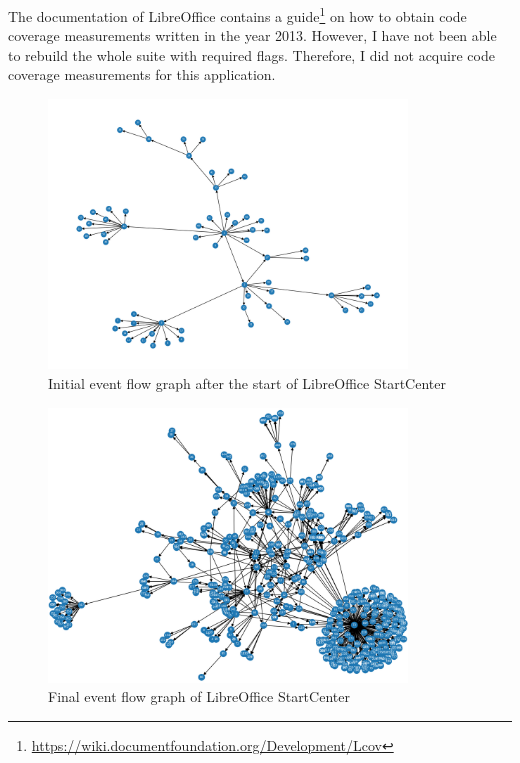 The documentation of LibreOffice contains a guide\footnote{\url{https://wiki.documentfoundation.org/Development/Lcov}} on how to obtain code coverage measurements written in the year 2013. However, I have not been able to rebuild the whole suite with required flags. Therefore, I did not acquire code coverage measurements for this application.   


\begin{figure}[H]
	\centering
	\includegraphics[width=0.85\textwidth,clip]{obrazky-figures/liibreoffice_n_start.png}
	\caption{Initial event flow graph after the start of LibreOffice StartCenter}
	\label{libreoffice-graph1}
\end{figure}

\begin{figure}[H]
	\centering
	\includegraphics[width=0.85\textwidth,clip]{obrazky-figures/libreoffice_n_end.png}
	\caption{Final event flow graph of LibreOffice StartCenter}
	\label{libreoffice-graph2}
\end{figure}

